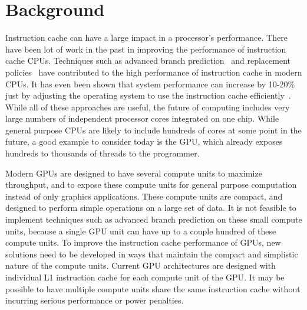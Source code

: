 \section{Background}

Instruction cache can have a large impact in a processor's
performance. 
There have been lot of work in the past in improving the performance
of instruction cache  CPUs. 
Techniques such as advanced branch prediction~\cite{yeh93} and
replacement policies~\cite{smith85} have contributed to the high
performance of instruction cache in modern CPUs. 
It has even been shown that system performance can increase by 10-20\%
just by adjusting the operating system to use the instruction cache
efficiently~\cite{torrellas98}.
While all of these approaches are useful, the future of computing
includes very large numbers of independent processor cores integrated
on one chip.
While general purpose CPUs are likely to include hundreds of cores at
some point in the future, a good example to consider today is the GPU,
which already exposes hundreds to thousands of threads to the
programmer. 

Modern GPUs are designed to have several
compute units to maximize throughput, and to expose these compute
units for general purpose computation instead of only graphics
applications.
These compute units are compact, and designed to perform simple
operations on a large set of data. 
It is not feasible to implement techniques such as advanced branch
prediction on these small compute units, because a single GPU unit
can have up to a couple hundred of these compute units. 
To improve the instruction cache performance of GPUs, new solutions
need to be developed in ways that maintain the compact and simplistic
nature of the compute units. 
Current GPU architectures are designed with individual L1 instruction
cache for each compute unit of the GPU\cite{keckler11}. 
It may be possible to have multiple compute units share the same
instruction cache without incurring serious performance or power
penalties.
